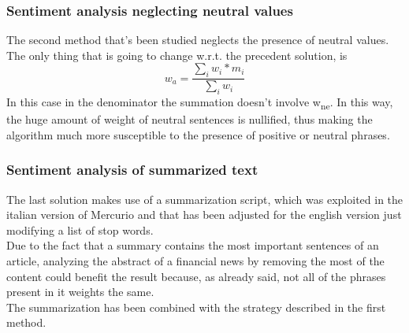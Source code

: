 \subsubsection{Sentiment analysis neglecting neutral values}

The second method that's been studied neglects the presence of neutral values. The only thing that is going to change w.r.t. the precedent solution, is 
\begin{equation}
w_a = \frac{\sum\limits_{i} w_i * m_i}{\sum\limits_{i} w_i} 
\end{equation}
In this case in the denominator the summation doesn't involve w\textsubscript{ne}. In this way, the huge amount of weight of neutral sentences is nullified, thus making the algorithm much more susceptible to the presence of positive or neutral phrases.\\

\subsubsection{Sentiment analysis of summarized text}
The last solution makes use of a summarization script, which was exploited in the italian version of Mercurio and that has been adjusted for the english version just modifying a list of stop words. \\
Due to the fact that a summary contains the most important sentences of an article, analyzing the abstract of a financial news by removing the most of the content could benefit the result because, as already said, not all of the phrases present in it weights the same. \\
The summarization has been combined with the strategy described in the first method. 

